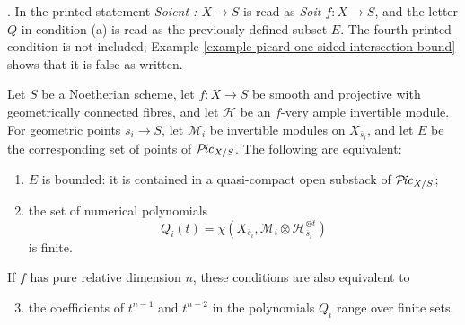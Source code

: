 \begin{theorem}
\label{theorem-picard-boundedness-Hilbert-polynomial}
\begin{reference}
\cite[Expos\'e 236, Theorem 4.1, pp. 242--243]{FGA}. In the printed
statement \emph{Soient : $X\to S$} is read as
\emph{Soit $f:X\to S$}, and the letter $Q$ in condition (a) is read as the
previously defined subset $E$. The fourth printed condition is not included;
Example \ref{example-picard-one-sided-intersection-bound} shows that it is
false as written.
\end{reference}
Let $S$ be a Noetherian scheme, let $f:X\to S$ be smooth and projective with
geometrically connected fibres, and let $\mathcal{H}$ be an $f$-very ample
invertible module. For geometric points $\overline{s}_i\to S$, let
$\mathcal{M}_i$ be invertible modules on $X_{\overline{s}_i}$, and let $E$
be the corresponding set of points of $\mathcal{P}\!\mathit{ic}_{X/S}$. The following
are equivalent:
\begin{enumerate}
\item $E$ is bounded: it is contained in a quasi-compact open substack of
$\mathcal{P}\!\mathit{ic}_{X/S}$;
\item the set of numerical polynomials
$$
Q_i(t)=\chi(X_{\overline{s}_i},
\mathcal{M}_i\otimes\mathcal{H}^{\otimes t}_{\overline{s}_i})
$$
is finite.
\end{enumerate}
If $f$ has pure relative dimension $n$, these conditions are also equivalent
to
\begin{enumerate}
\setcounter{enumi}{2}
\item the coefficients of $t^{n-1}$ and $t^{n-2}$ in the polynomials $Q_i$
range over finite sets.
\end{enumerate}
\end{theorem}

